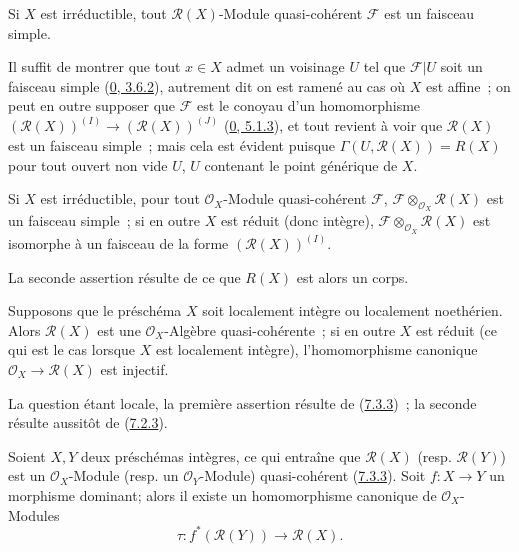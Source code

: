 \begin{corollary}[7.3.5]
\label{I.7.3.5-fr}
Si $X$ est irréductible, tout $\mathscr{R}(X)$-Module quasi-cohérent
$\mathscr{F}$ est un faisceau simple.
\end{corollary}

Il suffit de montrer que tout $x\in X$ admet un voisinage $U$ tel que
$\mathscr{F}|U$ soit un faisceau simple
(\hyperref[0.3.6.2-fr]{0, 3.6.2}), autrement dit on est ramené au cas où $X$
est affine~; on peut en outre supposer que $\mathscr{F}$ est le conoyau d'un
homomorphisme
$(\mathscr{R}(X))^{(I)}\to(\mathscr{R}(X))^{(J)}$
(\hyperref[0.5.1.3-fr]{0, 5.1.3}), et tout revient à voir que
$\mathscr{R}(X)$ est un faisceau simple~; mais cela est évident puisque
$\Gamma(U,\mathscr{R}(X))=R(X)$ pour tout ouvert non vide $U$, $U$ contenant
le point générique de $X$.

\begin{corollary}[7.3.6]
\label{I.7.3.6-fr}
Si $X$ est irréductible, pour tout $\mathscr{O}_X$-Module quasi-cohérent
$\mathscr{F}$, $\mathscr{F}\otimes_{\mathscr{O}_X}\mathscr{R}(X)$ est un
faisceau simple~; si en outre $X$ est réduit (donc intègre),
$\mathscr{F}\otimes_{\mathscr{O}_X}\mathscr{R}(X)$ est isomorphe à un
faisceau de la forme $(\mathscr{R}(X))^{(I)}$.
\end{corollary}

La seconde assertion résulte de ce que $R(X)$ est alors un corps.

\begin{proposition}[7.3.7]
\label{I.7.3.7-fr}
Supposons que le préschéma $X$ soit localement intègre ou localement
noethérien. Alors $\mathscr{R}(X)$ est une $\mathscr{O}_X$-Algèbre
quasi-cohérente~; si en outre $X$ est réduit (ce qui est le cas lorsque $X$
est localement intègre), l'homomorphisme canonique
$\mathscr{O}_X\to\mathscr{R}(X)$ est injectif.
\end{proposition}

La question étant locale, la première assertion résulte de
(\hyperref[I.7.3.3-fr]{7.3.3})~; la seconde résulte aussitôt de
(\hyperref[I.7.2.3-fr]{7.2.3}).

\begin{env}[7.3.8]
\label{I.7.3.8-fr}
Soient $X,Y$ deux préschémas intègres, ce qui entraîne que
$\mathscr{R}(X)$ (resp. $\mathscr{R}(Y)$) est un $\mathscr{O}_X$-Module (resp. un
$\mathscr{O}_Y$-Module) quasi-cohérent (\hyperref[I.7.3.3-fr]{7.3.3}). Soit $f:X\to Y$ un
morphisme dominant; alors il existe un homomorphisme canonique de
$\mathscr{O}_X$-Modules
\[
  \tau:f^*(\mathscr{R}(Y))\to\mathscr{R}(X).
\tag{7.3.8.1}
\label{I.7.3.8.1-fr}
\]
\end{env}

